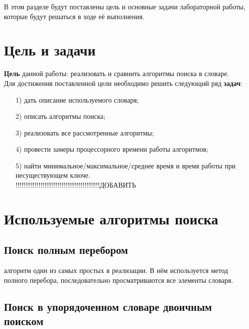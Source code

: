 В этом разделе будут поставлены цель и основные задачи лабораторной работы, которые будут решаться в ходе её выполнения.

\section{Цель и задачи}
\qquad\textbf{Цель} данной работы: реализовать и сравнить алгоритмы поиска в словаре.\\

Для достижения поставленной цели необходимо решить следующий ряд \textbf{задач}:
\begin{enumerate}
	\item[1)] дать описание используемого словаря;
	\item[2)] описать алгоритмы поиска;
	\item[3)] реализовать все рассмотренные алгоритмы;
	\item[4)] провести замеры процессорного времени работы алгоритмов;
	\item[5)] найти минимальное/максимальное/среднее время и время работы при несуществующем ключе.\\
	
	!!!!!!!!!!!!!!!!!!!!!!!!!!!!!!!!!!!!!!!!!!!!ДОБАВИТЬ
\end{enumerate}

\section{Используемые алгоритмы поиска}

\subsection{Поиск полным перебором}
 алгоритм один из самых простых в реализации. В нём используется метод полного перебора, последовательно просматриваются все элементы словаря.\\

\subsection{Поиск в упорядоченном словаре двоичным поиском}
\qquad
